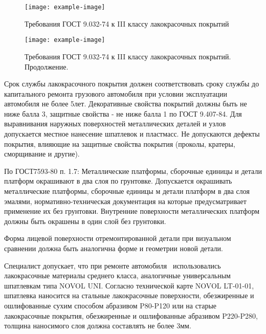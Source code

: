 {\begin{figure}[H]
	\centering
	\texttt{[image: example-image]}
	\caption[]{{\footnotesize Требования ГОСТ 9.032-74 к III классу лакокрасочных покрытий}}
	\label{нормап}
\end{figure}
\begin{figure}[H]
	\centering
	\texttt{[image: example-image]}
	\caption[]{{\footnotesize Требования ГОСТ 9.032-74 к III классу лакокрасочных покрытий. Продолжение}.}
	\label{нормап2}
\end{figure}

Срок службы лакокрасочного покрытия должен соответствовать сроку службы до
капитального ремонта грузового автомобиля при условии эксплуатации автомобиля не более
5лет. Декоративные свойства покрытий должны быть не ниже балла 3, защитные свойства -
не ниже балла 1 по ГОСТ 9.407-84. Для выравнивания наружных поверхностей
металлических деталей и узлов допускается местное нанесение шпатлевок и пластмасс. Не
допускаются дефекты покрытия, влияющие на защитные свойства покрытия (проколы,
кратеры, сморщивание и другие).

%

По ГОСТ7593-80 п. 1.7: Металлические платформы,
сборочные единицы и детали платформ окрашивают в два слоя по грунтовке. Допускается
окрашивать металлические платформы, сборочные единицы м детали платформ в два слоя
эмалями, нормативно-техническая документация на которые предусматривает применение
их без грунтовки. Внутренние поверхности металлических платформ должны быть
окрашены в один слой без грунтовки. 

Форма лицевой поверхности отремонтированной
детали при визуальном сравнении должна быть аналогична форме и геометрии новой
детали.


Специалист допускает, что при ремонте автомобиля \, использовались лакокрасочные материалы среднего класса, аналогичные универсальным шпатлевкам типа NOVOL UNI.  Согласно технической карте NOVOL LT-01-01, шпатлевка наносится на стальные лакокрасочные поверхности, обезжиренные и ошлифованные сухим способом абразивом P80-P120 или на старые лакокрасочные покрытия, обезжиренные и ошлифованные абразивом P220-P280, толщина наносимого слоя  должна составлять не более 3мм. 




}
